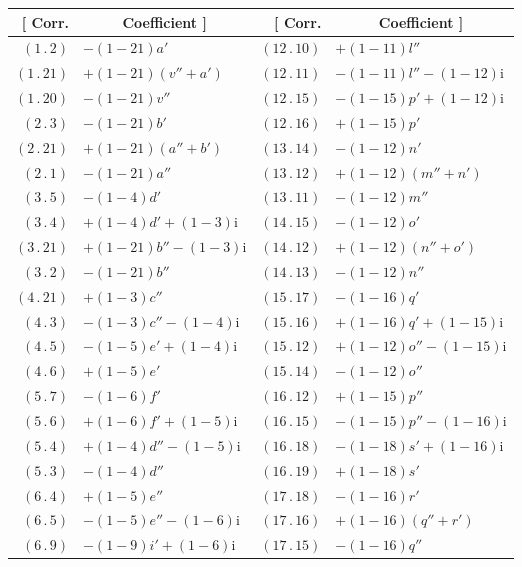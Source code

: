 \begin{center}
\begin{tabular}{|r|l||r|l|}
\hline
[ Corr.&\multicolumn{1}{c||}{Coefficient ]}&[ Corr.&\multicolumn{1}{c|}{Coefficient ]}\\
\hline
\((1\,.\,2)\)&\(-(1-21)a'\)&\((12\,.\,10)\)&\(+(1-11)l''\)\\
\((1\,.\,21)\)&\(+(1-21)(v''+a')\)&\((12\,.\,11)\)&\(-(1-11)l''-(1-12)\mathrm{i}\)\\
\((1\,.\,20)\)&\(-(1-21)v''\)&\((12\,.\,15)\)&\(-(1-15)p'+(1-12)\mathrm{i}\)\\
\((2\,.\,3)\)&\(-(1-21)b'\)&\((12\,.\,16)\)&\(+(1-15)p'\)\\
\((2\,.\,21)\)&\(+(1-21)(a''+b')\)&\((13\,.\,14)\)&\(-(1-12)n'\)\\
\((2\,.\,1)\)&\(-(1-21)a''\)&\((13\,.\,12)\)&\(+(1-12)(m''+n')\)\\
\((3\,.\,5)\)&\(-(1-4)d'\)&\((13\,.\,11)\)&\(-(1-12)m''\)\\
\((3\,.\,4)\)&\(+(1-4)d'+(1-3)\mathrm{i}\)&\((14\,.\,15)\)&\(-(1-12)o'\)\\
\((3\,.\,21)\)&\(+(1-21)b''-(1-3)\mathrm{i}\)&\((14\,.\,12)\)&\(+(1-12)(n''+o')\)\\
\((3\,.\,2)\)&\(-(1-21)b''\)&\((14\,.\,13)\)&\(-(1-12)n''\)\\
\((4\,.\,21)\)&\(+(1-3)c''\)&\((15\,.\,17)\)&\(-(1-16)q'\)\\
\((4\,.\,3)\)&\(-(1-3)c''-(1-4)\mathrm{i}\)&\((15\,.\,16)\)&\(+(1-16)q'+(1-15)\mathrm{i}\)\\
\((4\,.\,5)\)&\(-(1-5)e'+(1-4)\mathrm{i}\)&\((15\,.\,12)\)&\(+(1-12)o''-(1-15)\mathrm{i}\)\\
\((4\,.\,6)\)&\(+(1-5)e'\)&\((15\,.\,14)\)&\(-(1-12)o''\)\\
\((5\,.\,7)\)&\(-(1-6)f'\)&\((16\,.\,12)\)&\(+(1-15)p''\)\\
\((5\,.\,6)\)&\(+(1-6)f'+(1-5)\mathrm{i}\)&\((16\,.\,15)\)&\(-(1-15)p''-(1-16)\mathrm{i}\)\\
\((5\,.\,4)\)&\(+(1-4)d''-(1-5)\mathrm{i}\)&\((16\,.\,18)\)&\(-(1-18)s'+(1-16)\mathrm{i}\)\\
\((5\,.\,3)\)&\(-(1-4)d''\)&\((16\,.\,19)\)&\(+(1-18)s'\)\\
\((6\,.\,4)\)&\(+(1-5)e''\)&\((17\,.\,18)\)&\(-(1-16)r'\)\\
\((6\,.\,5)\)&\(-(1-5)e''-(1-6)\mathrm{i}\)&\((17\,.\,16)\)&\(+(1-16)(q''+r')\)\\
\((6\,.\,9)\)&\(-(1-9)i'+(1-6)\mathrm{i}\)&\((17\,.\,15)\)&\(-(1-16)q''\)\\

\end{tabular}
\end{center}
